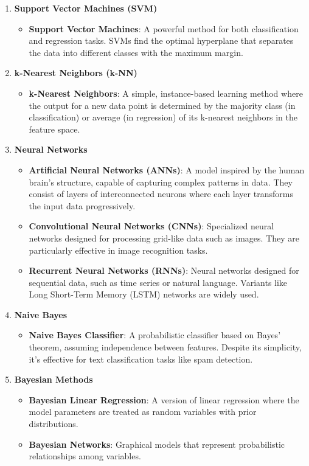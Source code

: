 \documentclass{article}
\begin{document}
\begin{enumerate}
    \item \textbf{Support Vector Machines (SVM)}
    \begin{itemize}
        \item \textbf{Support Vector Machines}: A powerful method for both classification and regression tasks. SVMs find the optimal hyperplane that separates the data into different classes with the maximum margin.
    \end{itemize}

    \item \textbf{k-Nearest Neighbors (k-NN)}
    \begin{itemize}
        \item \textbf{k-Nearest Neighbors}: A simple, instance-based learning method where the output for a new data point is determined by the majority class (in classification) or average (in regression) of its k-nearest neighbors in the feature space.
    \end{itemize}

    \item \textbf{Neural Networks}
    \begin{itemize}
        \item \textbf{Artificial Neural Networks (ANNs)}: A model inspired by the human brain's structure, capable of capturing complex patterns in data. They consist of layers of interconnected neurons where each layer transforms the input data progressively.
        \item \textbf{Convolutional Neural Networks (CNNs)}: Specialized neural networks designed for processing grid-like data such as images. They are particularly effective in image recognition tasks.
        \item \textbf{Recurrent Neural Networks (RNNs)}: Neural networks designed for sequential data, such as time series or natural language. Variants like Long Short-Term Memory (LSTM) networks are widely used.
    \end{itemize}

    \item \textbf{Naive Bayes}
    \begin{itemize}
        \item \textbf{Naive Bayes Classifier}: A probabilistic classifier based on Bayes' theorem, assuming independence between features. Despite its simplicity, it’s effective for text classification tasks like spam detection.
    \end{itemize}

    \item \textbf{Bayesian Methods}
    \begin{itemize}
        \item \textbf{Bayesian Linear Regression}: A version of linear regression where the model parameters are treated as random variables with prior distributions.
        \item \textbf{Bayesian Networks}: Graphical models that represent probabilistic relationships among variables.
    \end{itemize}


\end{enumerate}
\end{document}
